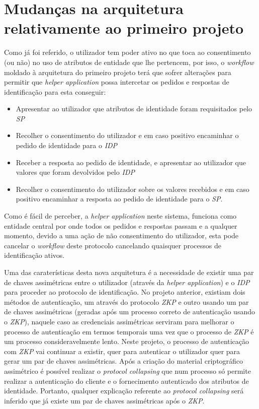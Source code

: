 \section{Mudanças na arquitetura relativamente ao primeiro projeto}

\quad Como já foi referido, o utilizador tem poder ativo no que toca ao consentimento (ou não) no uso de atributos de entidade que lhe pertencem, por isso, o \textit{workflow} moldado à arquitetura do primeiro projeto terá que sofrer alterações para permitir que \textit{helper application} possa intercetar os pedidos e respostas de identificação para esta conseguir:

\begin{itemize}
    \item Apresentar ao utilizador que atributos de identidade foram requisitados pelo \textit{SP}
    \item Recolher o consentimento do utilizador e em caso positivo encaminhar o pedido de identidade para o \textit{IDP}
    \item Receber a resposta ao pedido de identidade, e apresentar ao utilizador que valores que foram devolvidos pelo \textit{IDP}
    \item Recolher o consentimento do utilizador sobre os valores recebidos e em caso positivo encaminhar a resposta ao pedido de identidade para o \textit{SP}.
\end{itemize}

\quad Como é fácil de perceber, a \textit{helper application} neste sistema, funciona como entidade central por onde todos os pedidos e respostas passam e a qualquer momento, devido a uma ação de não consentimento do utilizador, esta pode cancelar o \textit{workflow} deste protocolo cancelando quaisquer processos de identificação ativos.


\quad Uma das caraterísticas desta nova arquitetura é a necessidade de existir uma par de chaves assimétricas entre o utilizador (através da \textit{helper application}) e o \textit{IDP} para proceder ao protocolo de identificação. No projeto anterior, existiam dois métodos de autenticação, um através do protocolo \textit{ZKP} e outro usando um par de chaves assimétricas (geradas após um processo correto de autenticação usando o \textit{ZKP}), naquele caso as credenciais assimétricas serviram para melhorar o processo de autenticação em termos temporais uma vez que o processo de \textit{ZKP} é um processo consideravelmente lento. Neste projeto, o processo de autenticação com \textit{ZKP} vai continuar a existir, quer para autenticar o utilizador quer para gerar um par de chaves assimétricas. Após a criação do material criptográfico assimétrico é possível realizar o \textit{protocol collapsing} que num processo só permite realizar a autenticação do cliente e o fornecimento autenticado dos atributos de identidade. Portanto, qualquer explicação referente ao \textit{protocol collapsing} será inferido que já existe um par de chaves assimétricas após o \textit{ZKP}.


